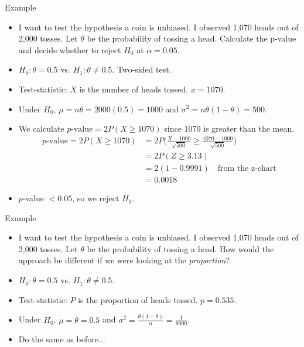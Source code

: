 \documentclass[10pt, xcolor=table]{beamer}
\begin{document}
\begin{frame}{Example}
\begin{itemize}
\setlength{\itemsep}{5pt}
\item I want to test the hypothesis a coin is unbiased. I observed 1,070 heads out of 2,000 tosses. Let $\theta$ be the probability of tossing a head. Calculate the p-value and decide whether to reject $H_0$ at $\alpha = 0.05$.
\item<2->[Ans:] \color{red} $H_0: \theta = 0.5$ vs. $H_1: \theta \neq 0.5$. Two-sided test.
\item<2->[] \color{red} Test-statistic: $X$ is the number of heads tossed. $x = 1070$.
\item<2->[] \color{red} Under $H_0$, $\mu = n\theta = 2000(0.5) = 1000$ and $\sigma^2 = n\theta(1-\theta) = 500$.
\item<2->[] \color{red} We calculate $p\text{-value} = 2P(X \geq 1070)$ since 1070 is greater than the mean.
\vspace*{-1ex}
\begin{align*}
p\text{-value} = 2P(X \geq 1070) &= 2P\bigg(\frac{X-1000}{\sqrt{500}} \geq \frac{1070-1000}{\sqrt{500}}\bigg)\\
&= 2P(Z \geq 3.13)\\
&= 2(1-0.9991) \quad \text{from the z-chart}\\
&= 0.0018
\end{align*}
\vspace*{-5ex}
\item<2->[] \color{red} $p$-value $< 0.05$, so we reject $H_0$.
\end{itemize}
\end{frame}

\begin{frame}{Example}
\begin{itemize}
\setlength{\itemsep}{10pt}
\item I want to test the hypothesis a coin is unbiased. I observed 1,070 heads out of 2,000 tosses. Let $\theta$ be the probability of tossing a head. How would the approach be different if we were looking at the \textit{proportion}?
\item<2->[Ans:] \color{red} $H_0: \theta = 0.5$ vs. $H_1: \theta \neq 0.5$.
\item<2->[] \color{red} Test-statistic: $P$ is the proportion of heads tossed. $p = 0.535$.
\item<2->[] \color{red} Under $H_0$, $\mu = \theta = 0.5$ and $\sigma^2 = \frac{\theta(1-\theta)}{n} = \frac{1}{8000}$.
\item<2->[] \color{red} Do the same as before...
\end{itemize}
\end{frame}
\end{document}
